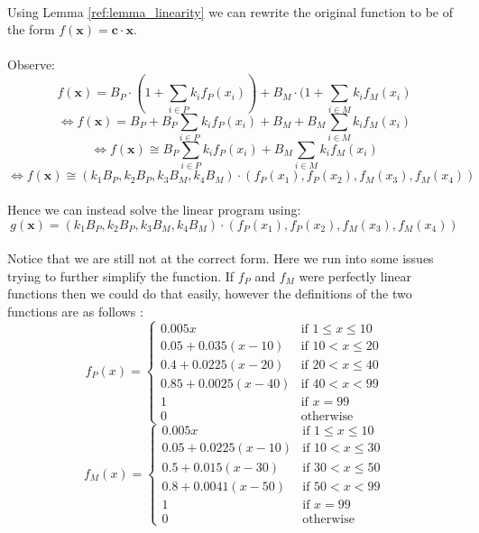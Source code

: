 \documentclass{article}
\begin{document}
\paragraph{}Using Lemma \ref{ref:lemma_linearity} we can rewrite the original function to be of the form $f(\boldsymbol{x})=\boldsymbol{c}\cdot \boldsymbol{x}$.
\paragraph{}Observe:
$$f(\boldsymbol{x}) = B_P\cdot (1 + \sum_{i \in P} k_i f_P(x_i)) + B_M \cdot (1 + \sum_{i \in M} k_i f_M(x_i)$$
$$\iff f(\boldsymbol{x}) = B_P + B_P \sum_{i \in P} k_i f_P(x_i) + B_M + B_M \sum_{i \in M} k_i f_M(x_i)$$
$$\iff f(\boldsymbol{x}) \cong B_P\sum_{i \in P} k_i f_P(x_i) + B_M\sum_{i \in M} k_i f_M(x_i)$$
$$\iff f(\boldsymbol{x}) \cong (k_1 B_P, k_2 B_P, k_3 B_M, k_4 B_M)\cdot (f_P (x_1), f_P(x_2), f_M(x_3), f_M(x_4))$$

\paragraph{}Hence we can instead solve the linear program using: 
\begin{equation}
    g(\boldsymbol{x})=(k_1 B_P, k_2 B_P, k_3 B_M, k_4 B_M)\cdot (f_P (x_1), f_P(x_2), f_M(x_3), f_M(x_4))
\end{equation}
\paragraph{}Notice that we are still not at the correct form. Here we run into some issues trying to further simplify the function. If $f_P$ and $f_M$ were perfectly linear functions then we could do that easily, however the definitions of the two functions are as follows \cite{dswiki-formula} \cite{dswiki-formula-2}:
\begin{equation}
f_{P}(x)=
    \begin{cases}
        0.005x & \text{if } 1 \leq x \leq 10 \\
        0.05 + 0.035(x-10) & \text{if } 10 < x \leq 20 \\
        0.4 + 0.0225(x-20) & \text{if } 20 < x \leq 40 \\
        0.85 + 0.0025(x-40) & \text{if } 40 < x < 99 \\
        1 & \text{if } x = 99 \\
        0 & \text{otherwise}
    \end{cases}
\end{equation}
\begin{equation}
f_{M}(x)=
    \begin{cases}
        0.005x & \text{if } 1 \leq x \leq 10 \\
        0.05 + 0.0225(x-10) & \text{if } 10 < x \leq 30 \\
        0.5 + 0.015(x-30) & \text{if } 30 < x \leq 50 \\
        0.8 + 0.0041(x-50) & \text{if } 50 < x < 99 \\
        1 & \text{if } x = 99 \\
        0 & \text{otherwise}
    \end{cases}
\end{equation}
\end{document}
